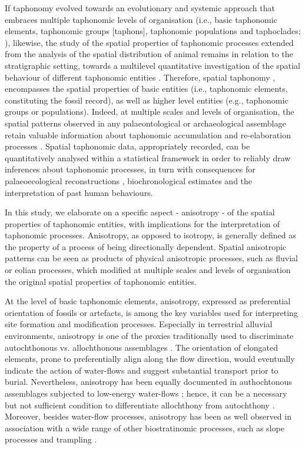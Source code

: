 \documentclass[review,times,authoryear]{elsarticle} %
\begin{document}
If taphonomy evolved towards an evolutionary and systemic approach that embraces multiple taphonomic levels of organisation (i.e., basic taphonomic elements, taphonomic groups [taphons], taphonomic populations and taphoclades; \citealp{Fernandez-Lopez2006}), likewise, the study of the spatial properties of taphonomic processes extended from the analysis of the spatial distribution of animal remains in relation to the stratigraphic setting, towards a multilevel quantitative investigation of the spatial behaviour of different taphonomic entities \citep[\emph{sensu}][]{Fernandez-Lopez2006}. Therefore, spatial taphonomy \citep{Giusti2016,Dominguez-Rodrigo2017}, encompasses the spatial properties of basic entities (i.e., taphonomic elements, constituting the fossil record), as well as higher level entities (e.g., taphonomic groups or populations). Indeed, at multiple scales and levels of organisation, the spatial patterns observed in any palaeontological or archaeological assemblage retain valuable information about taphonomic accumulation and re-elaboration processes \citep[\emph{sensu}][]{Fernandez-Lopez2002}. Spatial taphonomic data, appropriately recorded, can be quantitatively analysed within a statistical framework in order to reliably draw inferences about taphonomic processes, in turn with consequences for palaeoecological reconstructions \citep{Fernandez-Jalvo2011}, biochronological estimates and the interpretation of past human behaviours.

In this study, we elaborate on a specific aspect - anisotropy - of the spatial properties of taphonomic entities, with implications for the interpretation of taphonomic processes. Anisotropy, as opposed to isotropy, is generally defined as the property of a process of being directionally dependent. Spatial anisotropic patterns can be seen as products of physical anisotropic processes, such as fluvial or eolian processes, which modified at multiple scales and levels of organisation the original spatial properties of taphonomic entities.

At the level of basic taphonomic elements, anisotropy, expressed as preferential orientation of fossils or artefacts, is among the key variables used for interpreting site formation and modification processes. Especially in terrestrial alluvial environments, anisotropy is one of the proxies traditionally used to discriminate autochthonous vs. allochthonous assemblages \citep[][among others]{Petraglia1987,Petraglia1994,Schick1987a,Toots1965,Voorhies1969}. The orientation of elongated elements, prone to preferentially align along the flow direction, would eventually indicate the action of water-flows and suggest substantial transport prior to burial. Nevertheless, anisotropy has been equally documented in authochtonous assemblages subjected to low-energy water-flows \citep{Cobo-Sanchez2014,Dominguez-Rodrigo2012,Dominguez-Rodrigo2014}; hence, it can be a necessary but not sufficient condition to differentiate allochthony from autochthony \citep{Lenoble2004}. Moreover, besides water-flow processes, anisotropy has been as well observed in association with a wide range of other biostratinomic processes, such as slope processes \citep{Bertran1995} and trampling \citep{Benito-Calvo2011a}.
\end{document}
